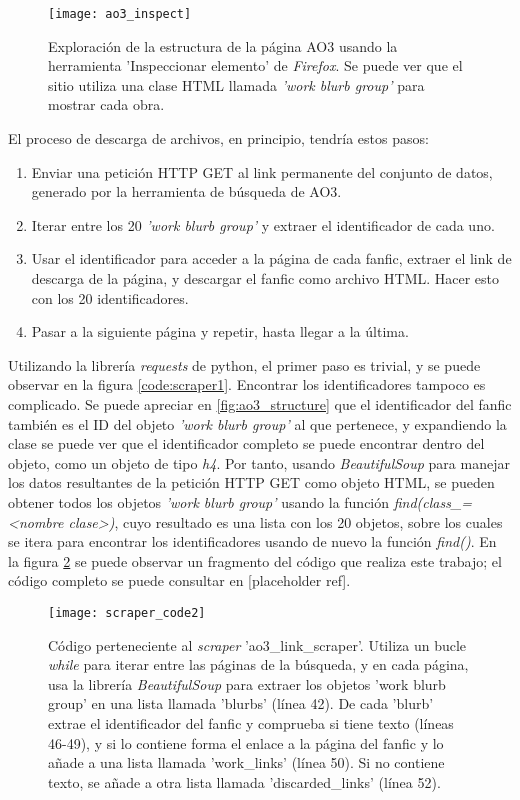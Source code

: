 \documentclass{pre-tfg}
\newcommand{\refToLinkScraperCode}{[placeholder ref]}
\begin{document}
\newpage

\begin{figure}
	\texttt{[image: ao3\_inspect]}
	\caption{Exploración de la estructura de la página AO3 usando la herramienta 'Inspeccionar elemento' de \textit{Firefox}. Se puede ver que el sitio utiliza una clase HTML llamada \textit{'work blurb group'} para mostrar cada obra.}
	\label{fig:ao3_inspect}
	\centering
\end{figure} 



El proceso de descarga de archivos, en principio, tendría estos pasos:

\begin{enumerate}
	\item Enviar una petición HTTP GET al link permanente del conjunto de datos, generado por la herramienta de búsqueda de AO3.
	\item Iterar entre los 20 \textit{'work blurb group'} y extraer el identificador de cada uno.
	\item Usar el identificador para acceder a la página de cada fanfic, extraer el link de descarga de la página, y descargar el fanfic como archivo HTML. Hacer esto con los 20 identificadores.
	\item Pasar a la siguiente página y repetir, hasta llegar a la última.
\end{enumerate}

Utilizando la librería \textit{requests} de python, el primer paso es trivial, y se puede observar en la figura \ref{code:scraper1}. Encontrar los identificadores tampoco es complicado. Se puede apreciar en \ref{fig:ao3_structure} que el identificador del fanfic también es el ID del objeto \textit{'work blurb group'} al que pertenece, y expandiendo la clase se puede ver que el identificador completo se puede encontrar dentro del objeto, como un objeto de tipo \textit{h4}. Por tanto, usando \textit{BeautifulSoup} para manejar los datos resultantes de la petición HTTP GET como objeto HTML, se pueden obtener todos los objetos \textit{'work blurb group'} usando la función \textit{find(class\_=<nombre clase>)}, cuyo resultado es una lista con los 20 objetos, sobre los cuales se itera para encontrar los identificadores usando de nuevo la función \textit{find()}. En la figura \ref{code:scraper2} se puede observar un fragmento del código que realiza este trabajo; el código completo se puede consultar en \refToLinkScraperCode.

\begin{figure}
	\texttt{[image: scraper\_code2]}
	\caption{Código perteneciente al \textit{scraper} 'ao3\_link\_scraper'. Utiliza un bucle \textit{while} para iterar entre las páginas de la búsqueda, y en cada página, usa la librería \textit{BeautifulSoup} para extraer los objetos 'work blurb group' en una lista llamada 'blurbs' (línea 42). De cada 'blurb' extrae el identificador del fanfic y comprueba si tiene texto (líneas 46-49), y si lo contiene forma el enlace a la página del fanfic y lo añade a una lista llamada 'work\_links' (línea 50). Si no contiene texto, se añade a otra lista llamada 'discarded\_links' (línea 52).}
	\label{code:scraper2}
\end{figure}
\end{document}

